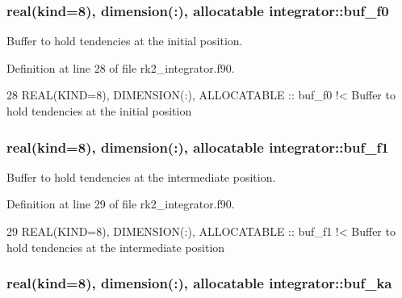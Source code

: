 \subsubsection[{\texorpdfstring{buf\+\_\+f0}{buf_f0}}]{\setlength{\rightskip}{0pt plus 5cm}real(kind=8), dimension(\+:), allocatable integrator\+::buf\+\_\+f0\hspace{0.3cm}{\ttfamily [private]}}\hypertarget{namespaceintegrator_aefe58ac9a698ca7d0440dcaf6103feea}{}\label{namespaceintegrator_aefe58ac9a698ca7d0440dcaf6103feea}


Buffer to hold tendencies at the initial position. 



Definition at line 28 of file rk2\+\_\+integrator.\+f90.


\begin{DoxyCode}
28   \textcolor{keywordtype}{REAL(KIND=8)}, \textcolor{keywordtype}{DIMENSION(:)}, \textcolor{keywordtype}{ALLOCATABLE} :: buf\_f0\textcolor{comment}{ !< Buffer to hold tendencies at the initial position}
\end{DoxyCode}
\subsubsection[{\texorpdfstring{buf\+\_\+f1}{buf_f1}}]{\setlength{\rightskip}{0pt plus 5cm}real(kind=8), dimension(\+:), allocatable integrator\+::buf\+\_\+f1\hspace{0.3cm}{\ttfamily [private]}}\hypertarget{namespaceintegrator_acabd8820aca8c50aac234c5d404493b4}{}\label{namespaceintegrator_acabd8820aca8c50aac234c5d404493b4}


Buffer to hold tendencies at the intermediate position. 



Definition at line 29 of file rk2\+\_\+integrator.\+f90.


\begin{DoxyCode}
29   \textcolor{keywordtype}{REAL(KIND=8)}, \textcolor{keywordtype}{DIMENSION(:)}, \textcolor{keywordtype}{ALLOCATABLE} :: buf\_f1\textcolor{comment}{ !< Buffer to hold tendencies at the intermediate
       position}
\end{DoxyCode}
\subsubsection[{\texorpdfstring{buf\+\_\+ka}{buf_ka}}]{\setlength{\rightskip}{0pt plus 5cm}real(kind=8), dimension(\+:), allocatable integrator\+::buf\+\_\+ka\hspace{0.3cm}{\ttfamily [private]}}\hypertarget{namespaceintegrator_a2afa4ff98b4a081aab43a4fae62fc8b1}{}\label{namespaceintegrator_a2afa4ff98b4a081aab43a4fae62fc8b1}


